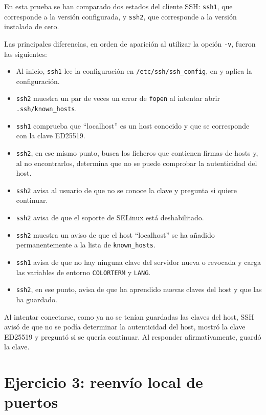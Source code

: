 \documentclass[11pt,a4paper]{article}
\begin{document}
En esta prueba se han comparado dos estados del cliente SSH:
\texttt{ssh1}, que corresponde a la versión configurada, y \texttt{ssh2}, que
corresponde a la versión instalada de cero.

Las principales diferencias, en orden de aparición al utilizar la opción
\texttt{-v}, fueron las siguientes:
\begin{itemize}
  \item Al inicio, \texttt{ssh1} lee la configuración en
  \texttt{/etc/ssh/ssh\_config}, en
   y aplica la
  configuración.
  \item \texttt{ssh2} muestra un par de veces un error de \texttt{fopen} al
  intentar abrir \texttt{.ssh/known\_hosts}.
  \item \texttt{ssh1} comprueba que ``localhost'' es un host conocido y que se
  corresponde con la clave ED25519.
  \item \texttt{ssh2}, en ese mismo punto, busca los ficheros que contienen
  firmas de hosts y, al no encontrarlos, determina que no se puede comprobar la
  autenticidad del host.
  \item \texttt{ssh2} avisa al usuario de que no se conoce la clave y pregunta
  si quiere continuar.
  \item \texttt{ssh2} avisa de que el soporte de SELinux está deshabilitado.
  \item \texttt{ssh2} muestra un aviso de que el host ``localhost'' se ha
  añadido permanentemente a la lista de \texttt{known\_hosts}.
  \item \texttt{ssh1} avisa de que no hay ninguna clave del servidor nueva o
  revocada y carga las variables de entorno \texttt{COLORTERM} y
  \texttt{LANG}.
  \item \texttt{ssh2}, en ese punto, avisa de que ha aprendido nuevas claves
  del host y que las ha guardado.
\end{itemize}

Al intentar conectarse, como ya no se tenían guardadas las claves del host, SSH
avisó de que no se podía determinar la autenticidad del host, mostró la clave
ED25519 y preguntó si se quería continuar. Al responder afirmativamente, guardó
la clave.

\section{Ejercicio 3: reenvío local de puertos}
\end{document}
